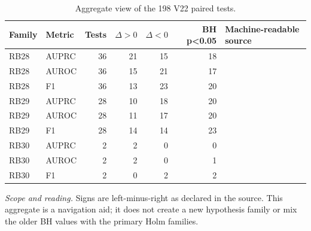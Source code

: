 \begin{table}[tbp]
\centering
\footnotesize
\setlength{\tabcolsep}{3.2pt}
\renewcommand{\arraystretch}{1.12}
\caption{Aggregate view of the 198 V22 paired tests.}
\label{tab:s-v22-stats-summary}
\begin{tabularx}{\textwidth}{@{}l l r r r r Y@{}}
\toprule
\textbf{Family} & \textbf{Metric} & \textbf{Tests} & \textbf{$\Delta>0$} & \textbf{$\Delta<0$} & \textbf{BH p<0.05} & \textbf{Machine-readable source} \\
\midrule
RB28 & AUPRC & 36 & 21 & 15 & 18 &  \\
RB28 & AUROC & 36 & 15 & 21 & 17 &  \\
RB28 & F1 & 36 & 13 & 23 & 20 &  \\
RB29 & AUPRC & 28 & 10 & 18 & 20 &  \\
RB29 & AUROC & 28 & 11 & 17 & 20 &  \\
RB29 & F1 & 28 & 14 & 14 & 23 &  \\
RB30 & AUPRC & 2 & 2 & 0 & 0 &  \\
RB30 & AUROC & 2 & 2 & 0 & 1 &  \\
RB30 & F1 & 2 & 0 & 2 & 2 &  \\
\bottomrule
\end{tabularx}
\vspace{2pt}
\begin{minipage}{\textwidth}\footnotesize\emph{Scope and reading.} Signs are left-minus-right as declared in the source. This aggregate is a navigation aid; it does not create a new hypothesis family or mix the older BH values with the primary Holm families.\end{minipage}
\end{table}

